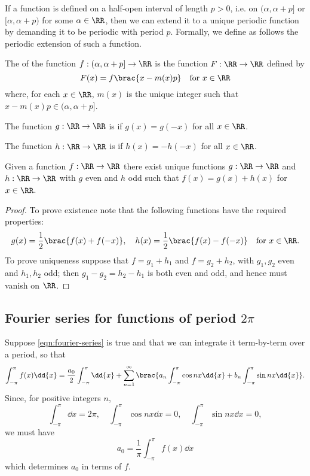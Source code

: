 If a function is defined on a half-open interval of length $p>0$, i.e. on $(\alpha,\alpha+p]$ or $[\alpha,\alpha+p)$ for some $\alpha\in\RR$, then we can extend it to a unique periodic function by demanding it to be periodic with period $p$. Formally, we define as follows the periodic extension of such a function.

\begin{definition}
The  of the function $f:(\alpha,\alpha+p]\to\RR$ is the function $F:\RR\to\RR$ defined by
\[ F(x) = f\brac{x-m(x)p} \quad \text{for }x\in\RR \]
where, for each $x\in\RR$, $m(x)$ is the unique integer such that $x-m(x)p\in(\alpha,\alpha+p]$.
\end{definition}

\begin{definition}
The function $g:\RR\to\RR$ is  if $g(x)=g(-x)$ for all $x\in\RR$.
\end{definition}

\begin{definition}
The function $h:\RR\to\RR$ is  if $h(x)=-h(-x)$ for all $x\in\RR$.
\end{definition}

\begin{proposition}
Given a function $f:\RR\to\RR$ there exist unique functions $g:\RR\to\RR$ and $h:\RR\to\RR$ with $g$ even and $h$ odd such that $f(x)=g(x)+h(x)$ for $x\in\RR$.
\end{proposition}

\begin{proof}
To prove existence note that the following functions have the required properties:
\[ g(x)=\frac{1}{2}\brac{f(x)+f(-x)}, \quad h(x)=\frac{1}{2}\brac{f(x)-f(-x)} \quad \text{for }x\in\RR. \]
To prove uniqueness suppose that $f=g_1+h_1$ and $f=g_2+h_2$, with $g_1,g_2$ even and $h_1,h_2$ odd; then $g_1-g_2=h_2-h_1$ is both even and odd, and hence must vanish on $\RR$.
\end{proof}

\subsection{Fourier series for functions of period $2\pi$}
Suppose \cref{eqn:fourier-series} is true and that we can integrate it term-by-term over a period, so that
\[ \int_{-\pi}^\pi f(x)\dd{x}=\frac{a_0}{2}\int_{-\pi}^\pi\dd{x}+\sum_{n=1}^\infty\brac{a_n\int_{-\pi}^\pi\cos nx\dd{x}+b_n\int_{-\pi}^\pi\sin nx\dd{x}}. \]
Since, for positive integers $n$,
\[ \int_{-\pi}^\pi\dd{x}=2\pi, \quad \int_{-\pi}^\pi\cos nx\dd{x}=0, \quad \int_{-\pi}^\pi\sin nx\dd{x}=0, \]
we must have
\begin{equation}\label{eqn:fourier-leading}
a_0=\frac{1}{\pi}\int_{-\pi}^\pi f(x)\dd{x}
\end{equation}
which determines $a_0$ in terms of $f$.

